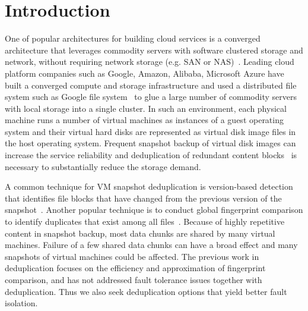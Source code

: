 \section{Introduction}

One of popular architectures for building cloud services
is a converged architecture that leverages commodity servers with software clustered storage and network, without 
requiring network storage (e.g. SAN or NAS)~\cite{NutanixPaper}. 
Leading cloud platform companies such as Google, Amazon, Alibaba,
Microsoft Azure  have built a converged compute and storage infrastructure and used
a distributed file system such as Google file system~\cite{googlefs03,hdfs10}
to glue a large number of commodity servers with local storage into a single cluster.
In such an environment,
each physical machine runs a number  of virtual machines as  instances of a guest operating system 
and their  virtual hard disks are represented as virtual disk image files in the host operating system.
Frequent  snapshot backup of virtual disk images  can increase  the service reliability
and deduplication of redundant content blocks~\cite{venti02,bottleneck08}
 is necessary to substantially reduce the storage demand.
 

A common technique for VM snapshot deduplication is    version-based detection that identifies file  blocks that have
changed from the previous version of the snapshot~\cite{Clements2009,Vrable2009,TanIPDPS2011}.
Another popular technique is to conduct global fingerprint  comparison to identify duplicates that exist
among all files~\cite{Guo2011,Dong2011,extreme_binning09}.
Because of highly repetitive content in snapshot backup,
most data chunks are shared by many virtual machines.  Failure of a few shared data chunks can have a 
broad effect and many snapshots of virtual machines could be affected.
The previous work in deduplication focuses on the efficiency and approximation of
fingerprint comparison, and has not addressed fault tolerance issues  together with deduplication.
Thus we also seek deduplication options that yield better fault isolation.


